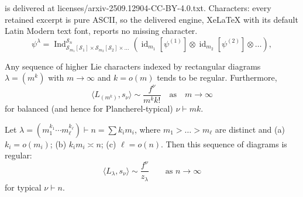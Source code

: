 \documentclass[10pt,a4paper]{amsart}
\newcommand{\Ind}{\operatorname{Ind}}
\newcommand{\al}{{\alpha}}
\newcommand{\id}{{\operatorname{id}}}
\newcommand{\la}{{\lambda}}
\renewcommand\S{{\mathcal S}}
\begin{document}
is delivered at licenses/arxiv-2509.12904-CC-BY-4.0.txt. Characters: every retained excerpt is pure ASCII, so the delivered engine, XeLaTeX with its default Latin Modern text font, reports no missing character.
\begin{equation}\label{eq:hlcformula}
\psi^{\la}=\Ind_{\S_{m_1}[\S_1]\times\S_{m_2}[\S_2]\times\ldots}^{\S_n}
\left(\id_{m_1}[\psi^{(1)}]\otimes\id_{m_2}[\psi^{(2)}]\otimes\ldots\right),
\end{equation}

\begin{theorem}\label{thm:rectangular}
    Any sequence of higher Lie characters indexed by rectangular diagrams $\la=(m^k)$ with $m\to\infty$ and $k = o(m)$ tends to be regular. Furthermore,
    \begin{equation*}%
        \langle L_{(m^k)},s_\nu \rangle
        \sim \frac{f^\nu}{m^kk!} 
        \quad \text{as} \quad m \to \infty
    \end{equation*}
    for balanced (and hence for Plancherel-typical) $\nu \vdash mk$. 
    
\end{theorem}

\begin{theorem}\label{thm:blocks}
Let $\la=(m_1^{k_1} \cdots m_\ell^{k_\ell}) \vdash n=\sum k_im_i$, where $m_1 > \dots > m_\ell$ are distinct and
{\rm(a)} $k_i=o(m_i)$; 
{\rm(b)} $k_im_i\asymp n$; 
{\rm(c)} $\ell = o(n)$. 
Then this sequence of diagrams is regular:
$$
    \langle L_{\la},s_\nu \rangle \sim \frac{f^\nu}{z_\la} \qquad \text{as }n\to \infty
$$ 
for  typical  $\nu\vdash n$.
\end{theorem}
\end{document}
